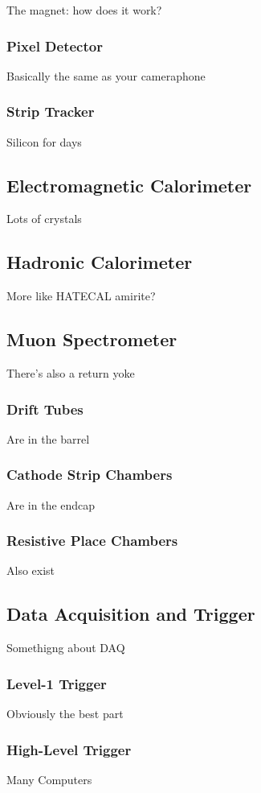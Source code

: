 The magnet: how does it work?

\subsubsection{Pixel Detector}
Basically the same as your cameraphone

\subsubsection{Strip Tracker}
Silicon for days


\subsection{Electromagnetic Calorimeter}
Lots of crystals


\subsection{Hadronic Calorimeter}
More like HATECAL amirite?


\subsection{Muon Spectrometer}
There's also a return yoke

\subsubsection{Drift Tubes}
Are in the barrel

\subsubsection{Cathode Strip Chambers}
Are in the endcap

\subsubsection{Resistive Place Chambers}
Also exist


\subsection{Data Acquisition and Trigger}
Somethigng about DAQ

\subsubsection{Level-1 Trigger}
Obviously the best part

\subsubsection{High-Level Trigger}
Many Computers
